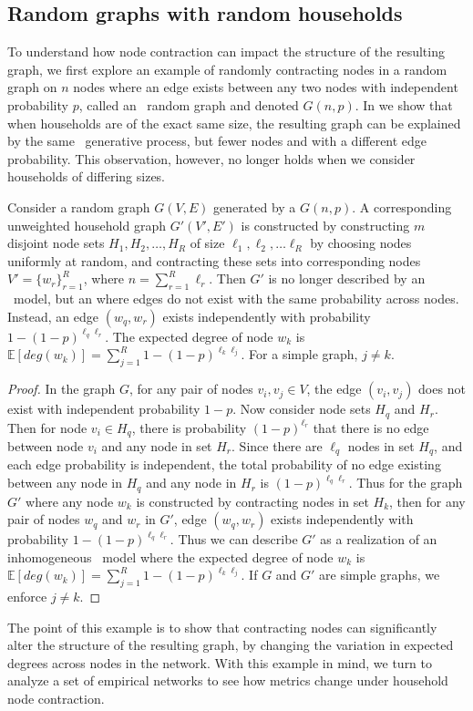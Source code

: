 \subsection{Random graphs with random households}\label{subsub:ER}

To understand how node contraction can impact the structure of the resulting graph, we first explore an example of randomly contracting nodes in a random graph on $n$ nodes where an edge exists between any two nodes with independent probability $p$, called an \ER~random graph and denoted $G(n, p)$. In  we show that when households are of the exact same size, the resulting graph can be explained by the same \ER~generative process, but fewer nodes and with a different edge probability. This observation, however, no longer holds when we consider households of differing sizes.

\begin{proposition}
   Consider a random graph $G(V,E)$ generated by a $G(n,p)$. A corresponding unweighted household graph $G'(V',E')$ is constructed by constructing $m$ disjoint node sets $H_1, H_2, \dots, H_R$ of size $\ell_1, \ell_2, \dots \ell_R$ by choosing nodes uniformly at random, and contracting these sets into corresponding nodes $V' = \{w_r\}_{r=1}^R$, where $n = \sum_{r=1}^R\ell_r$. Then $G'$ is no longer described by an \ER~model, but an  \citep{bollobas2007phase} where edges do not exist with the same probability across nodes. Instead, an edge $(w_q, w_r)$ exists independently with probability $1 - (1-p)^{\ell_q \ell_r }.$ The expected degree of node $w_k$ is $\mathbb{E}[deg(w_k)] = \sum_{j = 1}^R 1 - (1-p)^{\ell_k \ell_j}.$ For a simple graph, $j \neq k.$ 
\end{proposition}

\begin{proof}
    In the graph $G$, for any pair of nodes $v_i, v_j \in V$, the edge $(v_i, v_j)$ does not exist with independent probability $1-p$. Now consider node sets $H_q$ and $H_r$. Then for node $v_i \in H_q$, there is probability $(1-p)^{\ell_r}$ that there is no edge between node $v_i$ and any node in set $H_r$. Since there are $\ell_q$ nodes in set $H_q$, and each edge probability is independent, the total probability of no edge existing between any node in $H_q$ and any node in $H_r$ is $(1-p)^{\ell_q \ell_r }$. Thus for the graph $G'$ where any node $w_k$ is constructed by contracting nodes in set $H_k$, then for any pair of nodes $w_q$ and $w_r$ in $G'$, edge $(w_q, w_r)$ exists independently with probability $1 - (1-p)^{\ell_q \ell_r }.$ Thus we can describe $G'$ as a realization of an inhomogeneous \ER~model where the expected degree of node $w_k$ is $\mathbb{E}[deg(w_k)] = \sum_{j = 1}^R 1 - (1-p)^{\ell_k \ell_j}.$ If $G$ and $G'$ are simple graphs, we enforce $j \neq k$. 
\end{proof}

The point of this example is to show that contracting nodes can significantly alter the structure of the resulting graph, by changing the variation in expected degrees across nodes in the network. With this example in mind, we turn to analyze a set of empirical networks to see how metrics change under household node contraction.